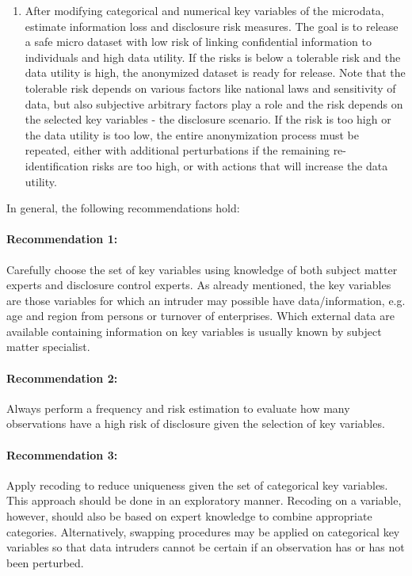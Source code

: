 \documentclass[12pt]{scrartcl}\usepackage[]{graphicx}\usepackage[]{color}
\begin{document}
\begin{enumerate}
\item After modifying categorical and numerical key variables of the microdata, estimate information loss and disclosure risk measures. The goal is to release a safe micro dataset with low risk of linking confidential information to individuals and high data utility. If the risks is below a tolerable risk and the data utility is high, the anonymized dataset is ready for release. Note that the tolerable risk depends on various factors like national laws and sensitivity of data, but also subjective arbitrary factors play a role and the risk depends on the selected key variables - the disclosure scenario. If the risk is too high or the data utility is too low, the entire anonymization process must be repeated, either with additional perturbations if the remaining re-identification risks are too high, or with actions that will increase the data utility.
\end{enumerate}

In general, the following recommendations hold:

\paragraph{Recommendation 1:} Carefully choose the set of key variables using knowledge of both subject matter experts and disclosure control experts. As already mentioned, the key variables are those variables for which an intruder may possible have data/information, e.g. age and region from persons or turnover of enterprises. Which external data are available containing information on key variables is usually known by subject matter specialist.
\paragraph{Recommendation 2:} Always perform a frequency and risk estimation to evaluate how many observations have a high risk of disclosure given the selection of key variables.
\paragraph{Recommendation 3:} Apply recoding to reduce uniqueness given the set of categorical key variables. This approach should be done in an exploratory manner. Recoding on a variable, however, should also be based on expert knowledge to combine appropriate categories. Alternatively, swapping procedures may be applied on categorical key variables so that data intruders cannot be certain if an observation has or has not been perturbed.
\end{document}
